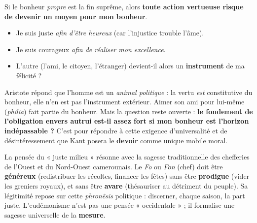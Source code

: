 \documentclass[11pt]{article}
\begin{document}
\begin{attention}
Si le bonheur \emph{propre} est la fin suprême, alors \textbf{toute action vertueuse risque de devenir un moyen pour mon bonheur}.
\begin{itemize}
    \item Je suis juste \emph{afin d'être heureux} (car l'injustice trouble l'âme).
    \item Je suis courageux \emph{afin de réaliser mon excellence}.
    \item L'autre (l'ami, le citoyen, l'étranger) devient-il alors un \textbf{instrument} de ma félicité ?
\end{itemize}
Aristote répond que l'homme est un \emph{animal politique} : la vertu \emph{est} constitutive du bonheur, elle n'en est pas l'instrument extérieur. Aimer son ami pour lui-même (\emph{philia}) fait partie du bonheur. Mais la question reste ouverte : \textbf{le fondement de l'obligation envers autrui est-il assez fort si mon bonheur est l'horizon indépassable ?} C'est pour répondre à cette exigence d'universalité et de désintéressement que Kant posera le \textbf{devoir} comme unique mobile moral.
\end{attention}

\begin{savaistu}
La pensée du « juste milieu » résonne avec la sagesse traditionnelle des chefferies de l'Ouest et du Nord-Ouest camerounais. Le \emph{Fo} ou \emph{Fon} (chef) doit être \textbf{généreux} (redistribuer les récoltes, financer les fêtes) sans être \textbf{prodigue} (vider les greniers royaux), et sans être \textbf{avare} (thésauriser au détriment du peuple). Sa légitimité repose sur cette \emph{phronêsis} politique : discerner, chaque saison, la part juste. L'eudémonisme n'est pas une pensée « occidentale » ; il formalise une sagesse universelle de la \textbf{mesure}.
\end{savaistu}
\end{document}

